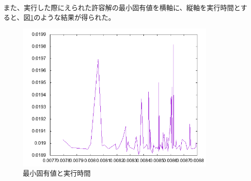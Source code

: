 また、実行した際にえられた許容解の最小固有値を横軸に、縦軸を実行時間とすると、図\ref{eigen}のような結果が得られた。
\begin{figure}
  \centering
  \includegraphics[width=10cm]{eigen.png}
  \caption{最小固有値と実行時間}
  \label{eigen}
\end{figure}
